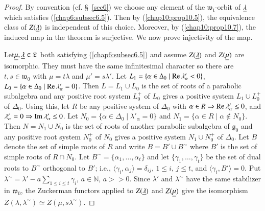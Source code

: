 \begin{proof}
By convention (cf. \S\ \ref{sec6}) we choose any element of the
$\mathfrak{w}_\mathfrak{t}$-orbit of $\underline{\lambda}$ which satisfies
(\ref{chap6:subsec6.5}). Then by (\ref{chap10:prop10.5}), the
equivalence class of $Z(\underline{\lambda})$ is 
independent of this choice. Moreover, by (\ref{chap10:prop10.7}), the induced map in
the theorem is surjective. We now prove injectivity of the map. 

Let\pageoriginale $\underline{\mu}, \underline{\lambda} \in\mathfrak{L} $ both
satisfying (\ref{chap6:subsec6.5}) and assume $Z(\underline{\lambda})$ and $Z(\underline{\mu})$ are
isomorphic. They must have the same infinitesimal character so there
are $t, s \in \mathfrak{w}_0$ with $\mu = t \lambda$ and $\mu' =
s\lambda'$. Let $L_1 = \{\alpha \in \Delta_0 \mid \operatorname{Re} \lambda'_\alpha
< 0\}$, $L_0 = \{\alpha \in\Delta_0 \mid \operatorname{Re} \lambda'_\alpha =
0\}$. Then $L = L_1 \cup L_0$ is the set of roots of a parabolic
subalgebra and any positive root system $L^+_0$ of $L_0$ gives a
positive system $L_1 \cup L^+_0$ of $\Delta_0$. Using this, let $R$ be
any positive system of $\Delta_0$ with $\alpha \in R \Rightarrow \operatorname{Re} \lambda'_\alpha  \leq 0$, and $\lambda'_\alpha
=0\Rightarrow \operatorname{Im} \lambda'_\alpha \leq 0$. Let $N_0 = \{\alpha \in
\Delta_0 \mid \lambda'_\alpha = 0\}$ and $N_1 = \{\alpha \in R \mid
\alpha \not\in N_0\}$. Then $N = N_1 \cup N_0$ is the set of roots of
another parabolic subalgebra of $\mathfrak{g}_0$ and any positive
root system $N^+_0$ of $N_0$ gives a positive system $N_1 \cup N^+_0$
of $\Delta_0$. Let $B$ denote the set of simple roots of $R$ and write
$B = B' \cup B^\sim$ where $B'$ is the set of simple roots of $R \cap
N_0$. Let $B^\sim = \{\alpha_1 , \ldots, \alpha_t\}$ and let
$\{\gamma_1, \ldots , \gamma_t\}$ be the set of dual roots to $B^\sim$
orthogonal to $B'$; i.e., $\langle \gamma_i, \alpha_j\rangle =
\delta_{ij}$, $1 \leq i$, $j \leq t$, and $\langle \gamma_i, B'\rangle
= 0$. Put $\lambda^\sim = \lambda' - a \sum\limits_{1 \leq i \leq t}
\gamma_i$, $a \in \mathbb{N}$, $a >> 0$. Since $\lambda'$ and
$\lambda^\sim$ have the same stabilizer in $\mathfrak{w}_0$, the
Zuckerman functors applied to $Z(\underline{\lambda})$ and $Z(\underline{\mu})$ give
the isomorphism $Z(\lambda, \lambda^\sim) \simeq Z(\mu, s
\lambda^\sim)$. 


\end{proof}
